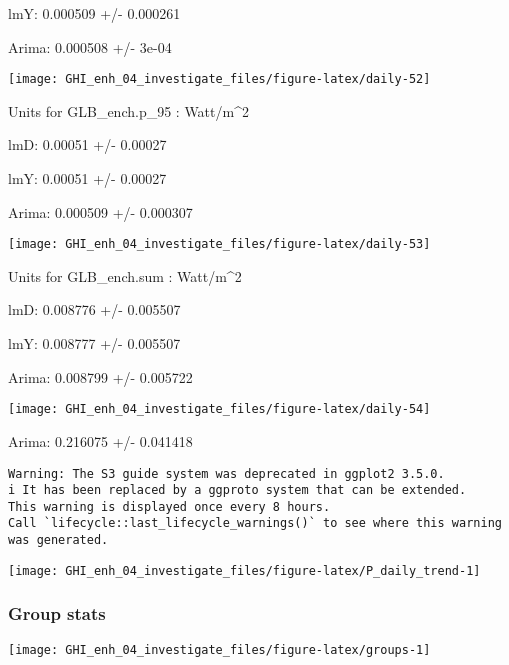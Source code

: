 \documentclass[
  10pt,
  a4paper,oneside]{article}
\begin{document}
lmY: 0.000509 +/- 0.000261

Arima: 0.000508 +/- 3e-04

\begin{center}\texttt{[image: GHI\_enh\_04\_investigate\_files/figure-latex/daily-52]} \end{center}

Units for GLB\_ench.p\_95 : Watt/m\^{}2

lmD: 0.00051 +/- 0.00027

lmY: 0.00051 +/- 0.00027

Arima: 0.000509 +/- 0.000307

\begin{center}\texttt{[image: GHI\_enh\_04\_investigate\_files/figure-latex/daily-53]} \end{center}

Units for GLB\_ench.sum : Watt/m\^{}2

lmD: 0.008776 +/- 0.005507

lmY: 0.008777 +/- 0.005507

Arima: 0.008799 +/- 0.005722

\begin{center}\texttt{[image: GHI\_enh\_04\_investigate\_files/figure-latex/daily-54]} \end{center}

Arima: 0.216075 +/- 0.041418

\begin{verbatim}
Warning: The S3 guide system was deprecated in ggplot2 3.5.0.
i It has been replaced by a ggproto system that can be extended.
This warning is displayed once every 8 hours.
Call `lifecycle::last_lifecycle_warnings()` to see where this warning was generated.
\end{verbatim}

\begin{center}\texttt{[image: GHI\_enh\_04\_investigate\_files/figure-latex/P\_daily\_trend-1]} \end{center}

\newpage
\FloatBarrier

\hypertarget{group-stats}{%
\subsubsection{Group stats}\label{group-stats}}

\begin{center}\texttt{[image: GHI\_enh\_04\_investigate\_files/figure-latex/groups-1]} \end{center}
\end{document}
